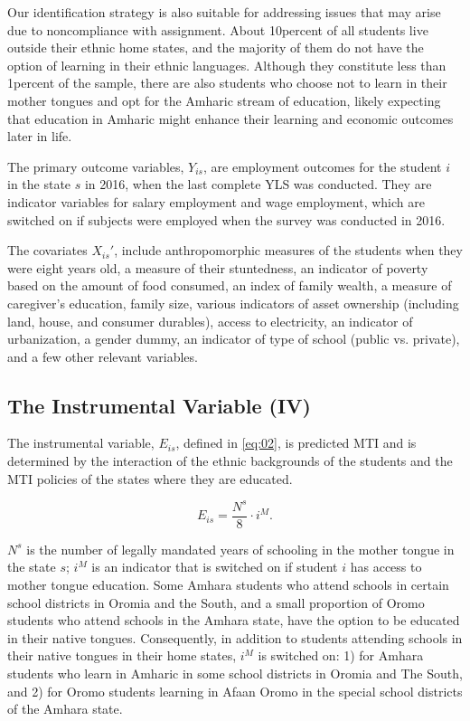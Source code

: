 Our identification strategy is also suitable for addressing issues that may arise due to noncompliance with assignment.  About 10percent of all students live outside their ethnic home states, and the majority of them do not have the option of learning in their ethnic languages. Although they constitute less than 1percent of the sample, there are also students who choose not to learn in their mother tongues and opt for the Amharic stream of education, likely expecting that education in Amharic might enhance their learning and economic outcomes later in life.  


The primary outcome variables, $ Y_{is} $, are employment outcomes for the student $ i $ in the state $ s $ in 2016, when the last complete YLS was conducted. They are indicator variables for salary employment and wage employment, which are switched on if subjects were employed when the survey was conducted in 2016.

The covariates $ X_{is}' $, include anthropomorphic measures of the students when they were eight years old, a measure of their stuntedness, an indicator of poverty based on the amount of food consumed, an index of family wealth, a measure of caregiver's education, family size, various indicators of asset ownership (including land, house, and consumer durables), access to electricity, an indicator of urbanization, a gender dummy, an indicator of type of school (public vs. private), and a few other relevant variables. 

\subsection*{The Instrumental Variable (IV)}

The instrumental variable, $ E_{is} $, defined in \eqref{eq:02}, is predicted MTI and is determined by the interaction of the ethnic backgrounds of the students and the MTI policies of the states where they are educated.

\begin{equation}\label{eq:02}
	E_{is} = \frac{N^{s}}{8}\cdot i^{M}.
\end{equation}

$ N^{s} $ is the number of legally mandated years of schooling in the mother tongue in the state $ s $; $ i^{M} $ is an indicator that is switched on if student $ i $ has access to mother tongue education. Some Amhara students who attend schools in certain school districts in Oromia and the South, and a small proportion of Oromo students who attend schools in the Amhara state, have the option to be educated in their native tongues. Consequently, in addition to students attending schools in their native tongues in their home states, $ i^{M} $ is switched on: 1) for Amhara students who learn in Amharic in some school districts in Oromia and The South, and 2) for Oromo students learning in Afaan Oromo in the special school districts of the Amhara state.

